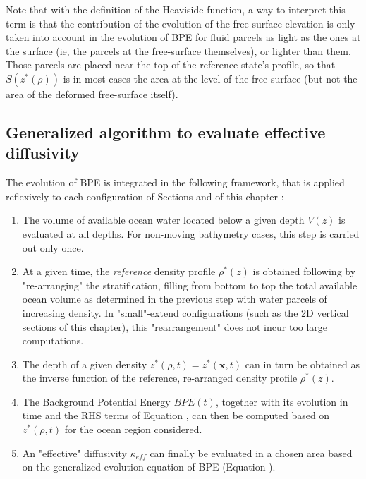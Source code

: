 Note that with the definition of the Heaviside function, a way to interpret this term is that the contribution of the evolution of the free-surface elevation is only taken into account in the evolution of BPE for fluid parcels as light as the ones at the surface (ie, the parcels at the free-surface themselves), or lighter than them. Those parcels are placed near the top of the reference state's profile, so that $S(z^*(\rho))$ is in most cases the area at the level of the free-surface (but not the area of the deformed free-surface itself).
\color{black}
\subsection{Generalized algorithm to evaluate effective diffusivity}
\label{BPE_algo}
The evolution of BPE is integrated in the following framework, that is applied reflexively to each configuration of Sections  and  of this chapter : 
\begin{enumerate}
\setlength\itemsep{0pt}
\item The volume of available ocean water located below a given depth $V(z)$ is evaluated at all depths. For non-moving bathymetry cases, this step is carried out only once. 
\item At a given time, the \textit{reference} density profile $\rho^*(z)$ is obtained following \citet{winters_available_1995} by "re-arranging" the stratification, filling from bottom to top the total available ocean volume as determined in the previous step with water parcels of increasing density. In "small"-extend configurations (such as the 2D vertical sections of this chapter), this "rearrangement" does not incur too large computations.
\item The depth of a given density $z^*(\rho,t)=z^*(\mathbf{x},t)$ can in turn be obtained as the inverse function of the reference, re-arranged density profile $\rho^*(z)$. 
\item The Background Potential Energy $BPE(t)$, together with its evolution in time and the RHS terms of Equation , can then be computed based on $z^*(\rho,t)$ for the ocean region considered.
\item An "effective" diffusivity $\kappa_{eff}$ can finally be evaluated in a chosen area based on the generalized evolution equation of BPE (Equation ).
\end{enumerate}

